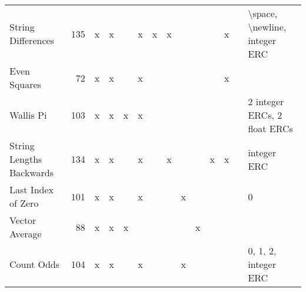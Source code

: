 \documentclass{sig-alternate}
\begin{document}
\begin{table*}
\begin{tabular}{>{\raggedright}p{2.6cm}rccccccccccc>{\raggedright}p{5.5cm}}
String Differences         & 135             & x    & x       &       & x       & x    & x      &                    &                  &                   & x     &            & \textbackslash space, \textbackslash newline, integer ERC                                                                                                                                                                   \tabularnewline
Even Squares               & 72              & x    & x       &       & x       &      &        &                    &                  &                   & x     &            &                                                                                                                                                                                                                             \tabularnewline
Wallis Pi                  & 103             & x    & x       & x     & x       &      &        &                    &                  &                   &       &            & 2 integer ERCs, 2 float ERCs                                                                                                                                                                                                \tabularnewline
String Lengths Backwards   & 134             & x    & x       &       & x       &      & x      &                    &                  & x                 & x     &            & integer ERC                                                                                                                                                                                                                 \tabularnewline
Last Index of Zero         & 101             & x    & x       &       & x       &      &        & x                  &                  &                   &       &            & 0                                                                                                                                                                                                                           \tabularnewline
Vector Average             & 88              & x    & x       & x     &         &      &        &                    & x                &                   &       &            &                                                                                                                                                                                                                             \tabularnewline
Count Odds                 & 104             & x    & x       &       & x       &      &        & x                  &                  &                   &       &            & 0, 1, 2, integer ERC                                                                                                                                                                                                        \tabularnewline

\end{tabular}
\end{table*}
\end{document}

